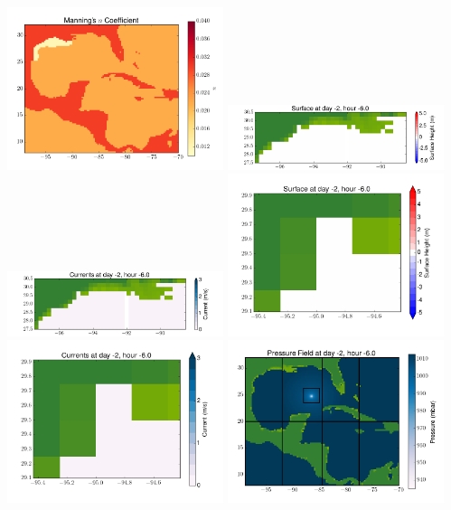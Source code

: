 \documentclass[11pt]{article}
\begin{document}
\vskip 10pt 
\includegraphics[width=0.475\textwidth]{frame0018fig3.png}
\includegraphics[width=0.475\textwidth]{frame0018fig4.png}
\vskip 10pt 
\includegraphics[width=0.475\textwidth]{frame0018fig5.png}
\includegraphics[width=0.475\textwidth]{frame0018fig6.png}
\vskip 10pt 
\includegraphics[width=0.475\textwidth]{frame0018fig7.png}
\includegraphics[width=0.475\textwidth]{frame0018fig8.png}
\end{document}

